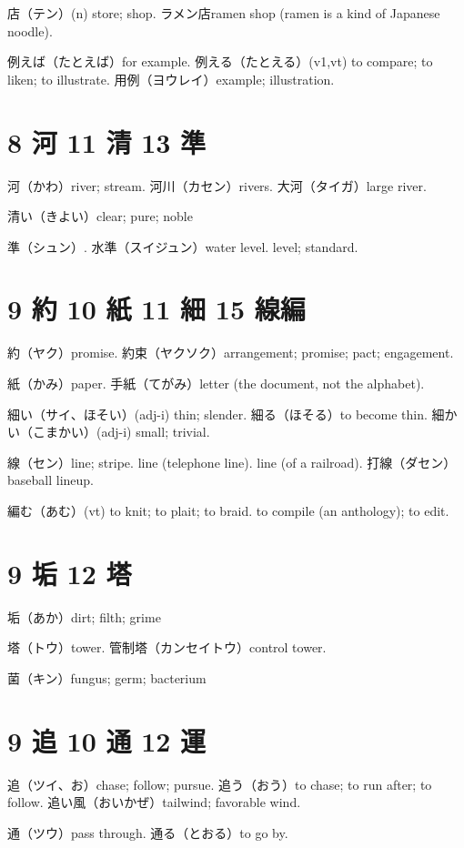 店（テン）(n) store; shop.
ラメン店ramen shop (ramen is a kind of Japanese noodle).

例えば（たとえば）for example.
例える（たとえる）(v1,vt)
to compare; to liken; to illustrate.
用例（ヨウレイ）example; illustration.

\section{8 河 11 清 13 準}

河（かわ）river; stream.
河川（カセン）rivers.
大河（タイガ）large river.

清い（きよい）clear; pure; noble

準（シュン）.
水準（スイジュン）water level. level; standard.

\section{9 約 10 紙 11 細 15 線編}

約（ヤク）promise.
約束（ヤクソク）arrangement; promise; pact; engagement.

紙（かみ）paper.
手紙（てがみ）letter (the document, not the alphabet).

細い（サイ、ほそい）(adj-i) thin; slender.
細る（ほそる）to become thin.
細かい（こまかい）(adj-i) small; trivial.

線（セン）line; stripe.
line (telephone line).
line (of a railroad).
打線（ダセン）baseball lineup.

編む（あむ）(vt)
to knit; to plait; to braid.
to compile (an anthology); to edit.

\section{9 垢 12 塔}

垢（あか）dirt; filth; grime

塔（トウ）tower.
管制塔（カンセイトウ）control tower.

菌（キン）fungus; germ; bacterium

\section{9 追 10 通 12 運}

追（ツイ、お）chase; follow; pursue.
追う（おう）to chase; to run after; to follow.
追い風（おいかぜ）tailwind; favorable wind.

通（ツウ）pass through.
通る（とおる）to go by.

